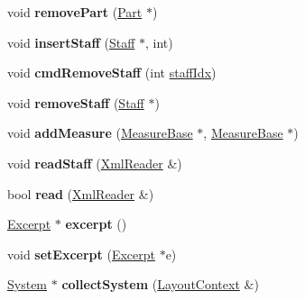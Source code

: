 \begin{DoxyCompactItemize}
\mbox{\label{class_ms_1_1_score_af88bb57c174eb6a3e79495a3899b879e}} 
void {\bfseries remove\+Part} (\hyperlink{class_ms_1_1_part}{Part} $\ast$)
\item 
\mbox{\label{class_ms_1_1_score_a0ceba2233bc3035aab01d9aac192f586}} 
void {\bfseries insert\+Staff} (\hyperlink{class_ms_1_1_staff}{Staff} $\ast$, int)
\item 
\mbox{\label{class_ms_1_1_score_a31a3ce6f8e3a3436c10f76acbb842cb4}} 
void {\bfseries cmd\+Remove\+Staff} (int \hyperlink{class_ms_1_1_score_aa4353d2ea4660f134a9030dbf9216b25}{staff\+Idx})
\item 
\mbox{\label{class_ms_1_1_score_ad77bdf8555f37b161135e873b0b81268}} 
void {\bfseries remove\+Staff} (\hyperlink{class_ms_1_1_staff}{Staff} $\ast$)
\item 
\mbox{\label{class_ms_1_1_score_a650e2a8236e2c7e47958c09ab9bbce90}} 
void {\bfseries add\+Measure} (\hyperlink{class_ms_1_1_measure_base}{Measure\+Base} $\ast$, \hyperlink{class_ms_1_1_measure_base}{Measure\+Base} $\ast$)
\item 
\mbox{\label{class_ms_1_1_score_a8efebc203c8d22d66e83928158e1360a}} 
void {\bfseries read\+Staff} (\hyperlink{class_ms_1_1_xml_reader}{Xml\+Reader} \&)
\item 
\mbox{\label{class_ms_1_1_score_ab1315f6648a4a069544e574bee9722c9}} 
bool {\bfseries read} (\hyperlink{class_ms_1_1_xml_reader}{Xml\+Reader} \&)
\item 
\mbox{\label{class_ms_1_1_score_a8f44073d4425a3634decdb7b9ad5a620}} 
\hyperlink{class_ms_1_1_excerpt}{Excerpt} $\ast$ {\bfseries excerpt} ()
\item 
\mbox{\label{class_ms_1_1_score_a6cb53961524b9b03c876f004291f106c}} 
void {\bfseries set\+Excerpt} (\hyperlink{class_ms_1_1_excerpt}{Excerpt} $\ast$e)
\item 
\mbox{\label{class_ms_1_1_score_a393fe76e521cb4f1be1d6ab526b64bdf}} 
\hyperlink{class_ms_1_1_system}{System} $\ast$ {\bfseries collect\+System} (\hyperlink{struct_ms_1_1_layout_context}{Layout\+Context} \&)

\end{DoxyCompactItemize}
